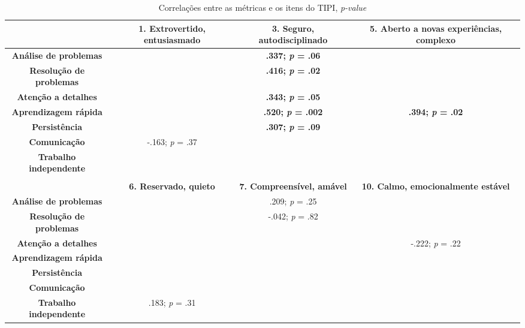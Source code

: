\begin{sidewaystable}[ph!]
\footnotesize
\caption{\small Correlações entre as métricas e os itens do TIPI, \textsl{p-value}}
\renewcommand{\arraystretch}{1.4} 
\centering
\begin{tabular}{lccc}

    \toprule
          & \textbf{1. Extrovertido, entusiasmado} & \textbf{3. Seguro, autodisciplinado} & \textbf{5. Aberto a novas experiências, complexo} \\
    \midrule
    \multicolumn{1}{c}{\textbf{Análise de problemas}} 	& 						  						& \textbf{.337; \textsl{p} = .06} & \textbf{} \\
    \multicolumn{1}{c}{\textbf{Resolução de problemas}} &													  & \textbf{.416; \textsl{p} = .02} & \textbf{} \\
    \multicolumn{1}{c}{\textbf{Atenção a detalhes}} 		&														& \textbf{.343; \textsl{p} = .05} & \\
    \multicolumn{1}{c}{\textbf{Aprendizagem rápida}} 		&														& \textbf{.520; \textsl{p} = .002} & \textbf{.394; \textsl{p} = .02} \\
    \multicolumn{1}{c}{\textbf{Persistência}} 					&														& \textbf{.307; \textsl{p} = .09} & \\
    \multicolumn{1}{c}{\textbf{Comunicação}} 						& -.163; \textsl{p} = .37		&																  & \\
    \multicolumn{1}{c}{\textbf{Trabalho independente}} 	&														&															    & \\
		
          &  &  &  \\

		\toprule					
          & \textbf{6. Reservado, quieto} & \textbf{7. Compreensível, amável} & \textbf{10. Calmo, emocionalmente estável} \\
		\midrule			
    \multicolumn{1}{c}{\textbf{Análise de problemas}} 	&													& .209;  \textsl{p} = .25  &  \\
    \multicolumn{1}{c}{\textbf{Resolução de problemas}} &													& -.042; \textsl{p} = .82  &  \\
    \multicolumn{1}{c}{\textbf{Atenção a detalhes}} 		&													&       									 & -.222; \textsl{p} = .22 \\
    \multicolumn{1}{c}{\textbf{Aprendizagem rápida}} 		&													&       									 &  \\
    \multicolumn{1}{c}{\textbf{Persistência}} 					&													&       									 &  \\
    \multicolumn{1}{c}{\textbf{Comunicação}} 						&													&       									 &  \\
    \multicolumn{1}{c}{\textbf{Trabalho independente}}	& .183; \textsl{p} = .31  &       									 &  \\
		

\end{tabular}
\end{sidewaystable}

